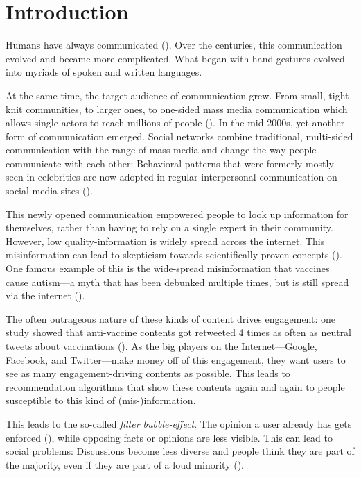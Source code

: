 \section{Introduction}
Humans have always communicated (\cite{tomasello2010origins}). Over the centuries, this communication evolved and became more complicated. What began with hand gestures evolved into myriads of spoken and written languages.

At the same time, the target audience of communication grew. From small, tight-knit communities, to larger ones, to one-sided mass media communication which allows single actors to reach millions of people (\cite{luhmann1995realitat}). In the mid-2000s, yet another form of communication emerged. Social networks combine traditional, multi-sided communication with the range of mass media and change the way people communicate with each other: Behavioral patterns that were formerly mostly seen in celebrities are now adopted in regular interpersonal communication on social media sites (\cite{stefanoneRelationshipTraditionalMass2010}).

This newly opened communication empowered people to look up information for themselves, rather than having to rely on a single expert in their community. However, low quality-information is widely spread across the internet. This misinformation can lead to skepticism towards scientifically proven concepts (\cite{krimskyRiskCommunicationInternet2007}). One famous example of this is the wide-spread misinformation that vaccines cause autism---a myth that has been debunked multiple times, but is still spread via the internet (\cite{baker2008mercury}).

The often outrageous nature of these kinds of content drives engagement: one study showed that anti-vaccine contents got retweeted 4 times as often as neutral tweets about vaccinations (\cite{blankenshipSentimentContentsRetweets2018}). As the big players on the Internet---Google, Facebook, and Twitter---make money off of this engagement, they want users to see as many engagement-driving contents as possible. This leads to recommendation algorithms that show these contents again and again to people susceptible to this kind of (mis-)information.

This leads to the so-called \emph{filter bubble-effect}. The opinion a user already has gets enforced (\cite{pariser2011filter}), while opposing facts or opinions are less visible. This can lead to social problems: Discussions become less diverse and people think they are part of the majority, even if they are part of a loud minority (\cite{moscoviciSilentMajoritiesLoud1991}).

